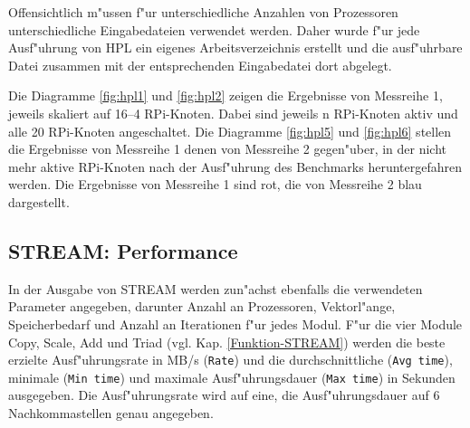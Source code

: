 Offensichtlich m"ussen f"ur unterschiedliche Anzahlen von Prozessoren unterschiedliche Eingabedateien verwendet werden. Daher wurde f"ur jede Ausf"uhrung von HPL ein eigenes Arbeitsverzeichnis erstellt und die ausf"uhrbare Datei zusammen mit der entsprechenden Eingabedatei dort abgelegt. 

Die Diagramme \ref{fig:hpl1} und \ref{fig:hpl2} zeigen die Ergebnisse von Messreihe 1, jeweils skaliert auf 16--4 RPi-Knoten. Dabei sind jeweils n RPi-Knoten aktiv und alle 20 RPi-Knoten angeschaltet.
\noindent
Die Diagramme \ref{fig:hpl5} und \ref{fig:hpl6} stellen die Ergebnisse von Messreihe 1 denen von Messreihe 2 gegen"uber, in der nicht mehr aktive RPi-Knoten nach der Ausf"uhrung des Benchmarks heruntergefahren werden. Die Ergebnisse von Messreihe 1 sind rot, die von Messreihe 2 blau dargestellt.

\subsection{STREAM: Performance}\label{Ergebnisse-STREAM}

In der Ausgabe von STREAM werden zun"achst ebenfalls die verwendeten Parameter angegeben, darunter Anzahl an Prozessoren, Vektorl"ange, Speicherbedarf und Anzahl an Iterationen f"ur jedes Modul. F"ur die vier Module Copy, Scale, Add und Triad (vgl. Kap. \ref{Funktion-STREAM}) werden die beste erzielte Ausf"uhrungsrate in MB/s (\texttt{Rate}) und die durchschnittliche (\texttt{Avg time}), minimale (\texttt{Min time}) und maximale Ausf"uhrungsdauer (\texttt{Max time}) in Sekunden ausgegeben. Die Ausf"uhrungsrate wird auf eine, die Ausf"uhrungsdauer auf 6 Nachkommastellen genau angegeben. 

